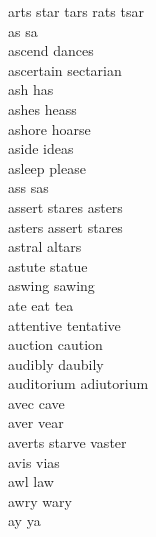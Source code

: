 arts star tars rats tsar\\
as sa\\
ascend dances\\
ascertain sectarian\\
ash has\\
ashes heass\\
ashore hoarse\\
aside ideas\\
asleep please\\
ass sas\\
assert stares asters\\
asters assert stares\\
astral altars\\
astute statue\\
aswing sawing\\
ate eat tea\\
attentive tentative\\
auction caution\\
audibly daubily\\
auditorium adiutorium\\
avec cave\\
aver vear\\
averts starve vaster\\
avis vias\\
awl law\\
awry wary\\
ay ya\\

